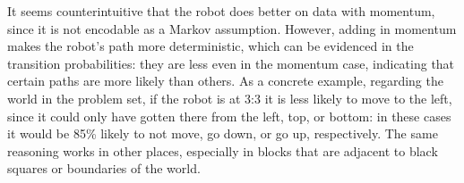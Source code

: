 \documentclass{article}
\begin{document}
\begin{enumerate}[(a)]
\begin{enumerate}
    It seems counterintuitive that the robot does better on data with
    momentum, since it is not encodable as a Markov assumption. However,
    adding in momentum makes the robot's path more deterministic, which
    can be evidenced in the transition probabilities: they are less even
    in the momentum case, indicating that certain paths are more likely
    than others. As a concrete example, regarding the world in the problem
    set, if the robot is at 3:3 it is less likely to move to the left,
    since it could only have gotten there from the left, top, or bottom:
    in these cases it would be 85\% likely to not move, go down, or go up,
    respectively. The same reasoning works in other places, especially
    in blocks that are adjacent to black squares or boundaries of the 
    world. 




  \end{enumerate}
\end{enumerate}
\end{document}
